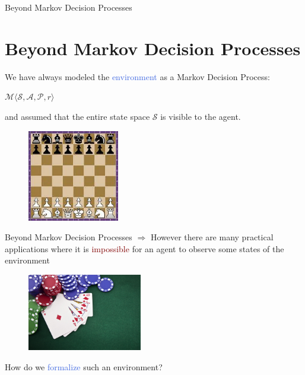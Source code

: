 \documentclass{beamer}
\begin{document}
\begin{frame}{Beyond Markov Decision Processes}
	\section{Beyond Markov Decision Processes}

	We have always modeled the \textcolor{RoyalBlue}{environment} as a Markov Decision Process:
	\begin{center}
		$\mathcal{M}\langle \mathcal{S}, \mathcal{A}, \mathcal{P}, r \rangle$
	\end{center}

	and assumed that the entire state space $\mathcal{S}$ is \textcolor{skymagenta}{visible} to the agent.

	\begin{center}
		\begin{figure}
			\includegraphics[width=4cm]{./Images/chess}
		\end{figure}
	\end{center}
\end{frame}

\begin{frame}{Beyond Markov Decision Processes}
	$\Rightarrow$ However there are many practical applications where it is \textcolor{Maroon}{impossible} for an agent to observe some states of the environment

	\begin{center}
		\begin{figure}
			\includegraphics[width=5cm]{./Images/poker}
		\end{figure}
	\end{center}

	\bigskip

	How do we \textcolor{RoyalBlue}{formalize} such an environment?
\end{frame}
\end{document}
